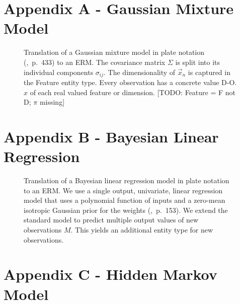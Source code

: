 \section*{Appendix A - Gaussian Mixture Model}

\vspace*{1em}
\begin{figure}[h!]
\centering
\scalebox{\tikzScale}{\adjustTikzSize }
\caption[Gaussian mixture model plate model to ERM translation]{Translation of a Gaussian mixture model in plate notation (\cite{bishop2006pattern},~p.~433) to an ERM. The covariance matrix $\Sigma$ is split into its individual components $\sigma_{ij}$. The dimensionality of $\vec x_n$ is captured in the Feature entity type. Every observation has a concrete value D-O.$x$ of each real valued feature or dimension. [TODO: Feature = F not D; $\pi$ missing]}\label{fig:gaussian_mixture}
\end{figure}

\newpage

\section*{Appendix B - Bayesian Linear Regression}

\vspace*{1em}
\begin{figure}[h!]
\centering
\scalebox{\tikzScale}{\adjustTikzSize }
\caption[Linear regression plate model to ERM translation]{Translation of a Bayesian linear regression model in plate notation to an ERM. We use a single output, univariate, linear regression model that uses a polynomial function of inputs and a zero-mean isotropic Gaussian prior for the weights (\cite{bishop2006pattern},~p.~153). We extend the standard model to predict multiple output values of new observations $M$. This yields an additional entity type for new observations.}\label{fig:bayesian_regression}
\end{figure}

\newpage

\section*{Appendix C - Hidden Markov Model}

